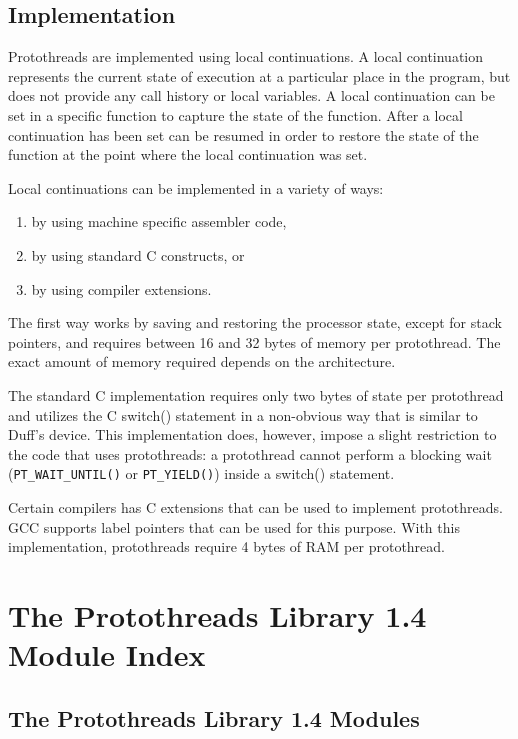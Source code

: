 \documentclass[12pt]{article}
\begin{document}
\begin{CJK}{UTF8}{bsmi}
\subsection{Implementation}

Protothreads are implemented using local continuations. A local continuation represents the current state of execution at a particular place in the program, but does not provide any call history or local variables.  A local continuation can be set in a specific function to capture the state of the function. After a local continuation has been set can be resumed in order to restore the state of the function at the point where the local continuation was set.

Local continuations can be implemented in a variety of ways:

\begin{enumerate}
\item by using machine specific assembler code,
\item by using standard C constructs, or
\item by using compiler extensions.
\end{enumerate}

The first way works by saving and restoring the processor state, except for stack pointers, and requires between 16 and 32 bytes of memory per protothread. The exact amount of memory required depends on the architecture.

The standard C implementation requires only two bytes of state per protothread and utilizes the C switch() statement in a non-obvious way that is similar to Duff’s device. This implementation does, however, impose a slight restriction to the code that uses protothreads: a protothread cannot perform a blocking wait (\verb+PT_WAIT_UNTIL()+ or \verb+PT_YIELD()+) inside a switch() statement.

Certain compilers has C extensions that can be used to implement protothreads. GCC supports label pointers that can be used for this purpose. With this implementation, protothreads require 4 bytes of RAM per protothread.

\section{The Protothreads Library 1.4 Module Index}

\subsection{The Protothreads Library 1.4 Modules}


\end{CJK}
\end{document}
